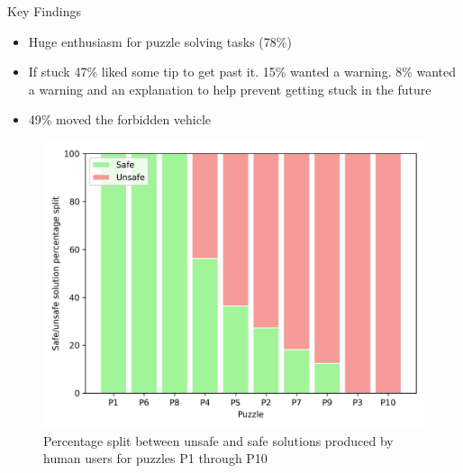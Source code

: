 \begin{frame}{Key Findings}
\begin{itemize}
\item Huge enthusiasm for puzzle solving tasks (78\%)
\item If stuck 47\% liked some tip to get past it. 15\% wanted a warning. 8\% wanted a warning and an explanation to help prevent getting stuck in the future
\item 49\% moved the forbidden vehicle
\end{itemize}
\begin{figure}[htb]
  \centering
\includegraphics[width=0.5\columnwidth]{img/p2.png}
  \caption{Percentage split between unsafe and safe solutions produced by human users for puzzles P1 through P10}
\end{figure}
\end{frame}